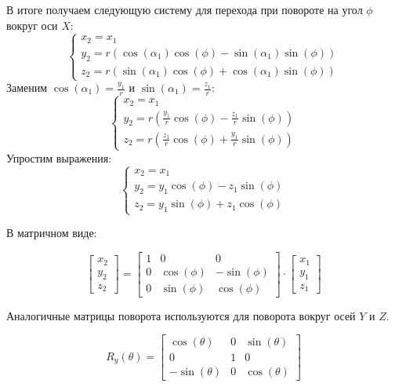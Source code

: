 В итоге получаем следующую систему для перехода при повороте на угол \(\phi\) вокруг оси \(X\):
\begin{equation}
\begin{cases}
    x_2 = x_1\\
    y_2 = r (\cos(\alpha_1)\cos(\phi)-\sin(\alpha_1)\sin(\phi))\\
    z_2 = r (\sin(\alpha_1)\cos(\phi)+\cos(\alpha_1)\sin(\phi))
\end{cases}
\end{equation}
Заменим \(\cos(\alpha_1)=\frac{y_1}{r}\) и \(\sin(\alpha_1)=\frac{z_1}{r}\):
\begin{equation}
\begin{cases}
    x_2 = x_1\\
    y_2 = r \left(\frac{y_1}{r}\cos(\phi)-\frac{z_1}{r}\sin(\phi)\right)\\
    z_2 = r \left(\frac{z_1}{r}\cos(\phi)+\frac{y_1}{r}\sin(\phi)\right)
\end{cases}
\end{equation}
Упростим выражения:
\begin{equation}
\begin{cases}
    x_2 = x_1\\
    y_2 =  y_1 \cos(\phi)-z_1\sin(\phi)\\
    z_2 = y_1\sin(\phi)+z_1 \cos(\phi)
\end{cases}
\end{equation}

В матричном виде:

\begin{equation}
\begin{bmatrix}
    x_2 \\ y_2 \\z_2
\end{bmatrix} = 
\begin{bmatrix}
    1 & 0 & 0 \\
    0 & \cos(\phi) & -\sin(\phi) \\
    0 & \sin(\phi) & \cos(\phi)
\end{bmatrix}
\cdot
\begin{bmatrix}
    x_1 \\ y_1 \\z_1
\end{bmatrix}
\end{equation}

Аналогичные матрицы поворота используются для поворота вокруг осей \(Y\) и \(Z\).

\begin{equation}
R_y(\theta) = \begin{bmatrix}
    \cos(\theta) & 0 & \sin(\theta) \\
    0 & 1 & 0 \\
    -\sin(\theta) & 0 & \cos(\theta)
\end{bmatrix} 
\end{equation}

